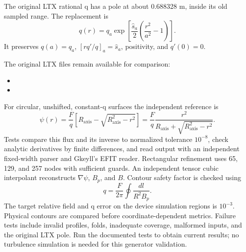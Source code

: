 \documentclass[11pt]{article}
\newcommand{\Ra}{R_{\mathrm{axis}}}
\begin{document}
The original LTX rational q has a pole at about 0.688328 m, inside its old
sampled range. The replacement is
\begin{equation}
q(r)=q_a\exp\left[\frac{\hat s_a}{2}\left(\frac{r^2}{a^2}-1\right)\right].
\end{equation}
It preserves $q(a)=q_a$, $[r q'/q]_{a}=\hat s_a$, positivity, and $q'(0)=0$.

The original LTX files remain available for comparison:
\begin{itemize}
\item {}
\item {}
\end{itemize}

For circular, unshifted, constant-q surfaces the independent reference is
\begin{equation}
\psi(r)=\frac{F}{q}\left[\Ra-\sqrt{\Ra^2-r^2}\right]
=\frac{F}{q}\frac{r^2}{\Ra+\sqrt{\Ra^2-r^2}}.
\end{equation}
Tests compare this flux and its inverse to normalized tolerance $10^{-8}$,
check analytic derivatives by finite differences, and read output with an
independent fixed-width parser and Gkeyll's EFIT reader. Rectangular refinement
uses 65, 129, and 257 nodes with sufficient guards. An independent tensor cubic
interpolant reconstructs $\nabla\psi$, $B_p$, and $B$. Contour safety factor is
checked using
\begin{equation}
q=\frac{F}{2\pi}\oint\frac{dl}{R^2B_p}.
\end{equation}
The target relative field and q error on the device simulation regions is
$10^{-3}$. Physical contours are compared before coordinate-dependent metrics.
Failure tests include invalid profiles, folds, inadequate coverage, malformed
inputs, and the original LTX pole. Run the documented tests to obtain current
results; no turbulence simulation is needed for this generator validation.
\end{document}
